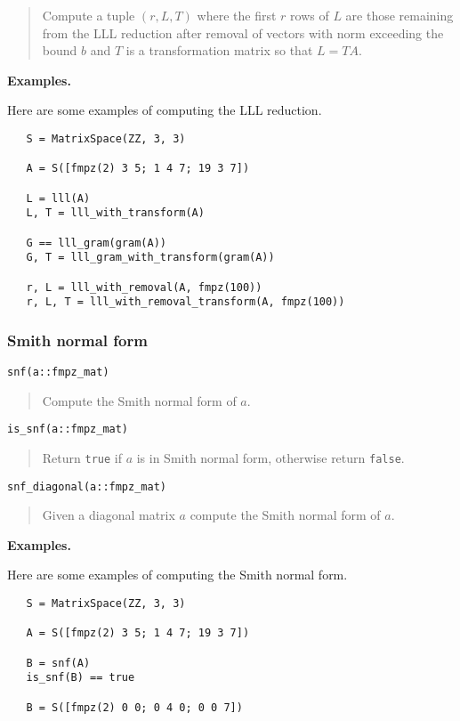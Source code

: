 \documentclass[a4paper,10pt]{article}
\newcommand{\code}{\lstinline}
\newcommand{\desc}[1]{\vspace{-3mm}\begin{quote}#1\end{quote}}
\begin{document}
{{\desc{Compute a tuple $(r, L, T)$ where the first $r$ rows of $L$ are those
remaining from the LLL reduction after removal of vectors with norm exceeding
the bound $b$ and $T$ is a transformation matrix so that $L = TA$.}

\textbf{Examples.}

Here are some examples of computing the LLL reduction.

\begin{lstlisting}
   S = MatrixSpace(ZZ, 3, 3)

   A = S([fmpz(2) 3 5; 1 4 7; 19 3 7])
   
   L = lll(A)
   L, T = lll_with_transform(A)

   G == lll_gram(gram(A))
   G, T = lll_gram_with_transform(gram(A))

   r, L = lll_with_removal(A, fmpz(100))
   r, L, T = lll_with_removal_transform(A, fmpz(100))
\end{lstlisting}

\subsubsection{Smith normal form}

\begin{lstlisting}
snf(a::fmpz_mat)
\end{lstlisting}

\desc{Compute the Smith normal form of $a$.}

\begin{lstlisting}
is_snf(a::fmpz_mat)
\end{lstlisting}

\desc{Return \code{true} if $a$ is in Smith normal form, otherwise return
\code{false}.}

\begin{lstlisting}
snf_diagonal(a::fmpz_mat)
\end{lstlisting}

\desc{Given a diagonal matrix $a$ compute the Smith normal form of $a$.}

\textbf{Examples.}

Here are some examples of computing the Smith normal form.

\begin{lstlisting}
   S = MatrixSpace(ZZ, 3, 3)

   A = S([fmpz(2) 3 5; 1 4 7; 19 3 7])
   
   B = snf(A)
   is_snf(B) == true

   B = S([fmpz(2) 0 0; 0 4 0; 0 0 7])


\end{lstlisting}}}
\end{document}
